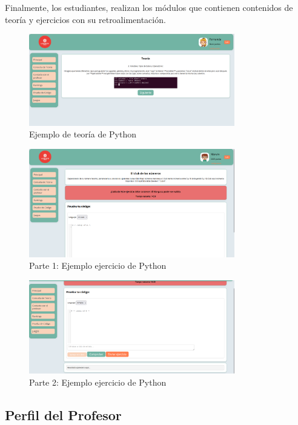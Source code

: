 \begin{appendices}
Finalmente, los estudiantes, realizan los módulos que contienen contenidos de teoría y ejercicios con su retroalimentación. 

\begin{figure}[H]
    \centering
    \includegraphics[width=0.8\textwidth]{imagenes/Manual/teoria.png}
    \caption{Ejemplo de teoría de Python}
\end{figure}

\begin{figure}[H]
    \centering
    \includegraphics[width=0.8\textwidth]{imagenes/Manual/ejercicio1.png}
    \caption{Parte 1: Ejemplo ejercicio de Python}
\end{figure}

\begin{figure}[H]
    \centering
    \includegraphics[width=0.8\textwidth]{imagenes/Manual/ejercicio2.png}
    \caption{Parte 2: Ejemplo ejercicio de Python}
\end{figure}

\subsection {Perfil del Profesor}


\end{appendices}
